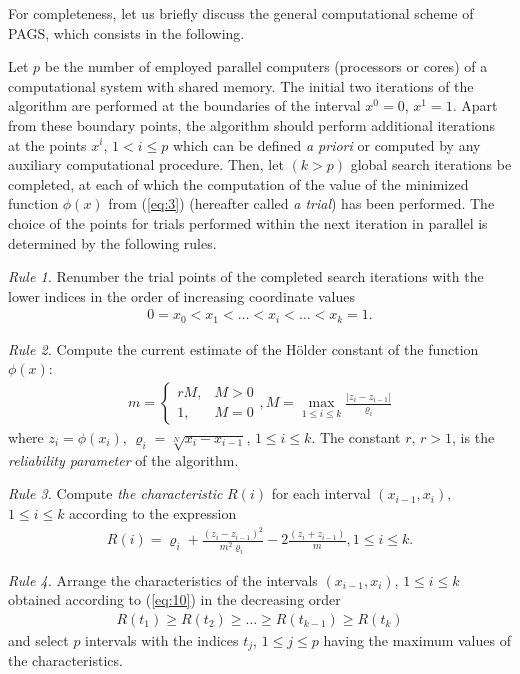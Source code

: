 For completeness, let us briefly discuss the general computational scheme of PAGS, which consists in the following.

Let $p$ be the number of employed parallel computers (processors or cores) of a computational system with shared memory. The initial two iterations of the algorithm are performed at the boundaries of the interval $x^0=0$, $x^1=1$. Apart from these boundary points, the algorithm should perform additional iterations at the points $x^i$, $1<i \leq p$ which can be defined \textit{a priori} or computed by any auxiliary computational procedure. Then, let $(k>p)$ global search iterations be completed, at each of which the computation of the value of the minimized function $\phi(x)$ from (\ref{eq:3}) (hereafter called \textit{a trial}) has been performed. The choice of the points for trials performed within the next iteration in parallel is determined by the following rules.

\textit{Rule 1.} Renumber the trial points of the completed search iterations with the lower indices in the order of increasing coordinate values
\begin{eqnarray} \label{eq:08}
	0=x_0<x_1<\dots<x_i<\dots<x_k=1.
\end{eqnarray}

\textit{Rule 2.} Compute the current estimate of the H\"{o}lder constant of the function $\phi(x)$:
\begin{eqnarray} \label{eq:09}
	m = 
 \begin{cases}
   r M, & M > 0 \\
   1,   & M = 0
 \end{cases} ,
 M = \max_{1 \leq i \leq k} {\frac{|z_i - z_{i-1}|} {\varrho_i} }
\end{eqnarray}
where $z_i=\phi(x_i)$, $\varrho_i=\sqrt[N]{x_i-x_{i-1}}$, $1 \leq i \leq k$. The constant $r$, $r>1$, is the \textit{reliability parameter} of the algorithm.

\textit{Rule 3.} Compute \textit{the characteristic} $R(i)$ for each interval $(x_{i-1},x_i)$, $1 \leq i \leq k$ according to the expression 
\begin{eqnarray} \label{eq:10}
R(i) = \varrho_i + \frac{(z_i - z_{i-1})^2}{m^2 \varrho_i} - 2 \frac{(z_i + z_{i-1})}{m}, 1 \leq i \leq k.
\end{eqnarray}

\textit{Rule 4.} Arrange the characteristics of the intervals $(x_{i-1},x_i)$, $1 \leq i \leq k$ obtained according to (\ref{eq:10}) in the decreasing order 
\begin{eqnarray} \label{eq:11}
R(t_1) \geq R(t_2)\geq \dots \geq R(t_{k-1}) \geq R(t_k) 
\end{eqnarray}
and select $p$ intervals with the indices $t_j$, $1 \leq j \leq p$ having the maximum values of the characteristics.

